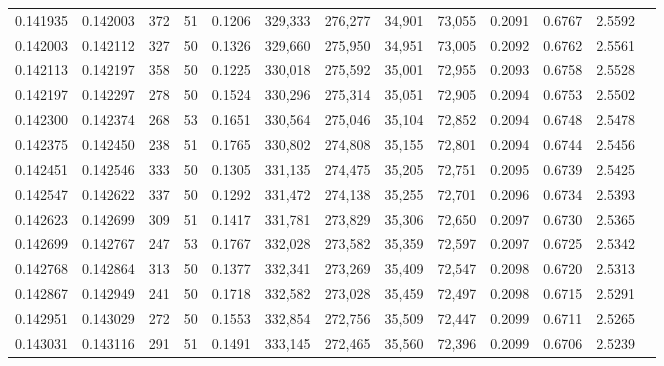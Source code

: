 \begin{tabular}{rrrrrrrrrrrrr}
0.141935 & 0.142003 &   372 &  51 &                                     0.1206 & 329,333 & 276,277 &  34,901 &  73,055 & 0.2091 & 0.6767 & 2.5592 \\
0.142003 & 0.142112 &   327 &  50 &                                     0.1326 & 329,660 & 275,950 &  34,951 &  73,005 & 0.2092 & 0.6762 & 2.5561 \\
0.142113 & 0.142197 &   358 &  50 &                                     0.1225 & 330,018 & 275,592 &  35,001 &  72,955 & 0.2093 & 0.6758 & 2.5528 \\
0.142197 & 0.142297 &   278 &  50 &                                     0.1524 & 330,296 & 275,314 &  35,051 &  72,905 & 0.2094 & 0.6753 & 2.5502 \\
0.142300 & 0.142374 &   268 &  53 &                                     0.1651 & 330,564 & 275,046 &  35,104 &  72,852 & 0.2094 & 0.6748 & 2.5478 \\
0.142375 & 0.142450 &   238 &  51 &                                     0.1765 & 330,802 & 274,808 &  35,155 &  72,801 & 0.2094 & 0.6744 & 2.5456 \\
0.142451 & 0.142546 &   333 &  50 &                                     0.1305 & 331,135 & 274,475 &  35,205 &  72,751 & 0.2095 & 0.6739 & 2.5425 \\
0.142547 & 0.142622 &   337 &  50 &                                     0.1292 & 331,472 & 274,138 &  35,255 &  72,701 & 0.2096 & 0.6734 & 2.5393 \\
0.142623 & 0.142699 &   309 &  51 &                                     0.1417 & 331,781 & 273,829 &  35,306 &  72,650 & 0.2097 & 0.6730 & 2.5365 \\
0.142699 & 0.142767 &   247 &  53 &                                     0.1767 & 332,028 & 273,582 &  35,359 &  72,597 & 0.2097 & 0.6725 & 2.5342 \\
0.142768 & 0.142864 &   313 &  50 &                                     0.1377 & 332,341 & 273,269 &  35,409 &  72,547 & 0.2098 & 0.6720 & 2.5313 \\
0.142867 & 0.142949 &   241 &  50 &                                     0.1718 & 332,582 & 273,028 &  35,459 &  72,497 & 0.2098 & 0.6715 & 2.5291 \\
0.142951 & 0.143029 &   272 &  50 &                                     0.1553 & 332,854 & 272,756 &  35,509 &  72,447 & 0.2099 & 0.6711 & 2.5265 \\
0.143031 & 0.143116 &   291 &  51 &                                     0.1491 & 333,145 & 272,465 &  35,560 &  72,396 & 0.2099 & 0.6706 & 2.5239 \\

\end{tabular}
